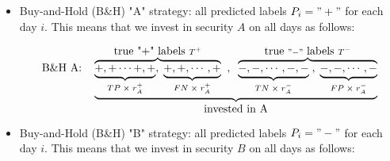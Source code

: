 \documentclass{article}
\begin{document}
\begin{itemize}[nosep]
\item Buy-and-Hold (B{\&}H) "A" strategy: all predicted labels $P_{i}="+"$ for each day $i$. This means that we invest in security $A$ on all days as follows:
\begin{comment}
\begin{equation*}
   \hbox{A Strategy:}  \quad \underbrace{
   \overbrace{\underbrace{ +,+\cdots +,+}_{TP} , 
    \;\underbrace{+,+,\cdots, + }_{FN}}^{\hbox{true "+" labels }T^{+}}
    \;\; , \;\; 
\overbrace{\underbrace{-,-,\cdots  ,-,-}_{TN}\; , \; 
\underbrace{ -,-,\cdots ,-}_{FP}}^{\hbox{true }"-"
\hbox{ labels } T^{-}} }_{\hbox{invested in A}}
\end{equation*}
\end{comment}
\begin{equation*}
   \hbox{B{\&}H A:}  \quad \underbrace{
   \overbrace{\underbrace{ +,+\cdots +,+}_{TP\;\times\; r_{A}^{+}} , 
    \;\underbrace{+,+,\cdots, + }_{FN\; \times \; r_{A}^{+}}}^{\hbox{true "+" labels }T^{+}}
    \;\; , \;\; 
\overbrace{\underbrace{-,-,\cdots  ,-,-}_{TN\; \times \; r_{A}^{-}}\; , \; 
\underbrace{ -,-,\cdots ,-}_{FP\; \times\; r_{A}^{-}}}^{\hbox{true }"-"
\hbox{ labels } T^{-}} }_{\hbox{invested in A}}
\end{equation*}
\begin{comment}
and can be computed approximately as
\begin{equation}
    R^{A} \approx T^{+}r_{A}^{+} + T^{-}r_{A}^{-} = (\text{TP} + \text{FN}) \, r_{A}^{+}  +
    (\text{TN} + \text{FP})\,  r_{A}^{-} 
    \label{buy_hold_strategy_return_a}
\end{equation}
\end{comment}
\item Buy-and-Hold (B{\&}H) "B" strategy: all predicted labels $P_{i}="-"$ for each day $i$. This means that we invest in security $B$ on all days as follows:
\begin{comment}
\begin{equation*}
   \hbox{B:}  \quad \underbrace{
   \overbrace{\underbrace{ +,+\cdots +,+}_{TP} , 
    \;\underbrace{+,+,\cdots, + }_{FN}}^{\hbox{true "+" labels }T^{+}}
    \;\; , \;\; 
\overbrace{\underbrace{-,-,\cdots  ,-,-}_{TN}\; , \; 
\underbrace{ -,-,\cdots ,-}_{FP}}^{\hbox{true }"-"
\hbox{ labels } T^{-}} }_{\hbox{invested in B}}
\end{equation*}
\end{comment}

\end{itemize}
\end{document}
